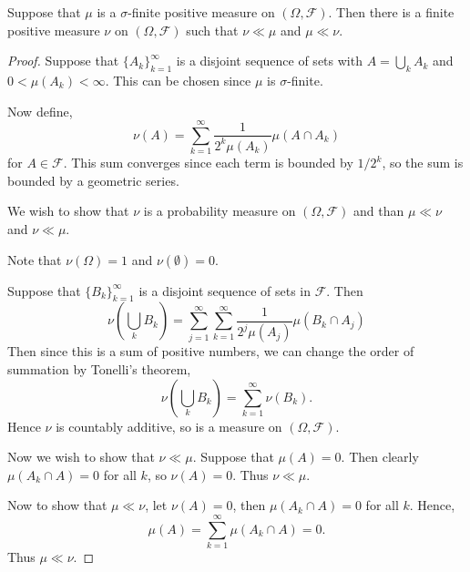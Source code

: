 \documentclass{unswmaths}
\begin{document}
\begin{theorem}
    Suppose that $\mu$ is a $\sigma$-finite positive measure on $(\Omega,\mathcal{F})$. Then there is a finite positive measure $\nu$
    on $(\Omega,\mathcal{F})$ such that $\nu \ll \mu$ and $\mu \ll \nu$.
\end{theorem}
\begin{proof}
    Suppose that $\{A_k\}_{k=1}^\infty$ is a disjoint sequence of sets
    with $A = \bigcup_k A_k$ and $0 < \mu(A_k) < \infty$. This can be chosen
    since $\mu$ is $\sigma$-finite.
    
    Now define,
    \begin{equation*}
        \nu(A) = \sum_{k=1}^\infty \frac{1}{2^k \mu(A_k)}\mu(A\cap A_k)
    \end{equation*}
    for $A \in \mathcal{F}$.
    This sum converges since each term is bounded by $1/2^k$, so the sum
    is bounded by a geometric series.
    
    We wish to show that $\nu$ is a probability measure
    on $(\Omega,\mathcal{F})$ and than $\mu \ll \nu$ and $\nu \ll \mu$. 
    
    Note that $\nu(\Omega) = 1$ and $\nu(\emptyset) = 0$.
    
    Suppose that $\{B_k\}_{k=1}^\infty$ is a disjoint sequence of sets
    in $\mathcal{F}$. Then
    \begin{equation*}
        \nu(\bigcup_k B_k) = \sum_{j=1}^\infty \sum_{k=1}^\infty \frac{1}{2^j \mu(A_j)}\mu(B_k\cap A_j)
    \end{equation*}
    Then since this is a sum of positive numbers, we can change the order
    of summation by Tonelli's theorem,
    \begin{equation*}
        \nu(\bigcup_k B_k) = \sum_{k=1}^\infty \nu(B_k).
    \end{equation*}
    Hence $\nu$ is countably additive, so is a measure on $(\Omega,\mathcal{F})$.
    
    Now we wish to show that $\nu \ll \mu$. Suppose that $\mu(A) = 0$.
    Then clearly $\mu(A_k \cap A) = 0$ for all $k$, so $\nu(A) = 0$. 
    Thus $\nu \ll \mu$.
    
    Now to show that $\mu \ll \nu$, let  
    $\nu(A) = 0$, then $\mu(A_k \cap A) = 0$ for all $k$. Hence,
    \begin{equation*}
        \mu(A) = \sum_{k=1}^\infty \mu(A_k\cap A) = 0.
    \end{equation*}
    Thus $\mu \ll \nu$. 
\end{proof}
\end{document}
